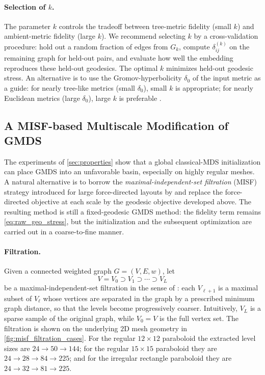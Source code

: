 \documentclass[twoside,11pt]{article}
\newcommand{\Gk}{G_k}
\begin{document}
\paragraph{Selection of $k$.}
The parameter $k$ controls the tradeoff between tree-metric fidelity
(small $k$) and ambient-metric fidelity (large $k$).  We recommend
selecting $k$ by a cross-validation procedure: hold out a random fraction
of edges from $\Gk$, compute $\delta^{(k)}_{ij}$ on the remaining graph
for held-out pairs, and evaluate how well the embedding reproduces these
held-out geodesics.  The optimal $k$ minimizes held-out geodesic stress.
An alternative is to use the Gromov-hyperbolicity $\delta_0$ of the input
metric as a guide: for nearly tree-like metrics (small $\delta_0$), small
$k$ is appropriate; for nearly Euclidean metrics (large $\delta_0$), large
$k$ is preferable \citep{gromov1987hyperbolic}.

\subsection{A MISF-based Multiscale Modification of GMDS}
\label{sec:misf_gmds}

The experiments of \cref{sec:properties} show that a global classical-MDS
initialization can place GMDS into an unfavorable basin, especially on highly
regular meshes.  A natural alternative is to borrow the
\emph{maximal-independent-set filtration} (MISF) strategy introduced for large
force-directed layouts by \citet{gajer2004multidimensional,gajer2002grip} and
replace the force-directed objective at each scale by the geodesic objective
developed above.  The resulting method is still a fixed-geodesic GMDS method:
the fidelity term remains \cref{eq:raw_geo_stress}, but the initialization and
the subsequent optimization are carried out in a coarse-to-fine manner.

\paragraph{Filtration.}
Given a connected weighted graph $G=(V,E,w)$, let
\[
  V = V_0 \supset V_1 \supset \cdots \supset V_L
\]
be a maximal-independent-set filtration in the sense of
\citet{gajer2004multidimensional,gajer2002grip}: each $V_{\ell+1}$ is a maximal
subset of $V_\ell$ whose vertices are separated in the graph by a prescribed
minimum graph distance, so that the levels become progressively coarser.
Intuitively, $V_L$ is a sparse sample of the original graph, while $V_0=V$ is
the full vertex set.  The filtration is shown on the underlying $2$D mesh
geometry in \cref{fig:misf_filtration_cases}.  For the regular $12\times 12$
paraboloid the extracted level sizes are $24 \rightarrow 50 \rightarrow 144$;
for the regular $15\times 15$ paraboloid they are
$24 \rightarrow 28 \rightarrow 84 \rightarrow 225$; and for the irregular
rectangle paraboloid they are $24 \rightarrow 32 \rightarrow 81 \rightarrow
225$.
\end{document}
